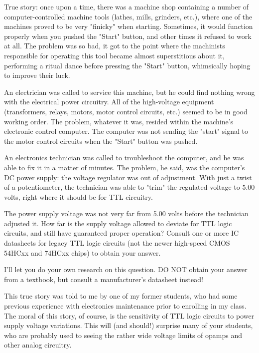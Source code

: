 

True story: once upon a time, there was a machine shop containing a number of computer-controlled machine tools (lathes, mills, grinders, etc.), where one of the machines proved to be very "finicky" when starting.  Sometimes, it would function properly when you pushed the "Start" button, and other times it refused to work at all.  The problem was so bad, it got to the point where the machinists responsible for operating this tool became almost superstitious about it, performing a ritual dance before pressing the "Start" button, whimsically hoping to improve their luck.

An electrician was called to service this machine, but he could find nothing wrong with the electrical power circuitry.  All of the high-voltage equipment (transformers, relays, motors, motor control circuits, etc.) seemed to be in good working order.  The problem, whatever it was, resided within the machine's electronic control computer.  The computer was not sending the "start" signal to the motor control circuits when the "Start" button was pushed.

An electronics technician was called to troubleshoot the computer, and he was able to fix it in a matter of minutes.  The problem, he said, was the computer's DC power supply: the voltage regulator was out of adjustment.  With just a twist of a potentiometer, the technician was able to "trim" the regulated voltage to 5.00 volts, right where it should be for TTL circuitry.

The power supply voltage was not very far from 5.00 volts before the technician adjusted it.  How far is the supply voltage allowed to deviate for TTL logic circuits, and still have guaranteed proper operation?  Consult one or more IC datasheets for legacy TTL logic circuits (not the newer high-speed CMOS 54HCxx and 74HCxx chips) to obtain your answer.







I'll let you do your own research on this question.  DO NOT obtain your answer from a textbook, but consult a manufacturer's datasheet instead!







This true story was told to me by one of my former students, who had some previous experience with electronics maintenance prior to enrolling in my class.  The moral of this story, of course, is the sensitivity of TTL logic circuits to power supply voltage variations.  This will (and should!) surprise many of your students, who are probably used to seeing the rather wide voltage limits of opamps and other analog circuitry.




